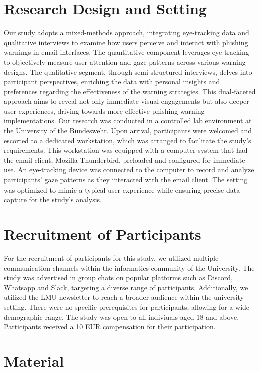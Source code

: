 \documentclass[
  a4paper,  %
  twoside,  %
  bibliography=totoc,
  headsepline,
  cleardoublepage=empty,
  parskip=half,
  draft=false
]{scrbook}
\begin{document}
\section{Research Design and Setting}
Our study adopts a mixed-methods approach, integrating eye-tracking data and qualitative interviews to examine how users perceive and interact with phishing warnings in email interfaces. The quantitative component leverages eye-tracking to objectively measure user attention and gaze patterns across various warning designs. The qualitative segment, through semi-structured interviews, delves into participant perspectives, enriching the data with personal insights and preferences regarding the effectiveness of the warning strategies. This dual-faceted approach aims to reveal not only immediate visual engagements but also deeper user experiences, driving towards more effective phishing warning implementations. \newline
Our research was conducted in a controlled lab environment at the University of the Bundeswehr. Upon arrival, participants were welcomed and escorted to a dedicated workstation, which was arranged to facilitate the study's requirements. This workstation was equipped with a computer system that had the email client, Mozilla Thunderbird, preloaded and configured for immediate use. An eye-tracking device was connected to the computer to record and analyze participants' gaze patterns as they interacted with the email client. The setting was optimized to mimic a typical user experience while ensuring precise data capture for the study's analysis.

\section{Recruitment of Participants}
For the recruitment of participants for this study, we utilized multiple communication channels within the informatics community of the University. The study was advertised in group chats on popular platforms such as Discord, Whatsapp and Slack, targeting a diverse range of participants. Additionally, we utilized the LMU newsletter to reach a broader audience within the university setting. There were no specific prerequisites for participants, allowing for a wide demographic range. The study was open to all indiviuals aged 18 and above. Participants received a 10 EUR compensation for their participation.\textbf{}

\section{Material}
\end{document}
